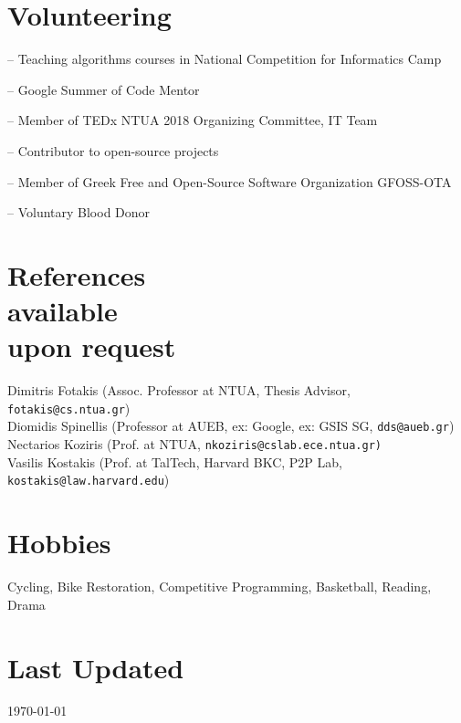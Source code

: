\documentclass[margin, 10pt]{res}
\begin{document}
\begin{resume}
\section{Volunteering} 
\begin{compactitem}
    \item[--] Teaching algorithms courses in National Competition for Informatics Camp 
    \item[--] Google Summer of Code Mentor
    \item[--] Member of TEDx NTUA 2018 Organizing Committee, IT Team 
    \item[--] Contributor to open-source projects
    \item[--] Member of Greek Free and Open-Source Software Organization GFOSS-OTA
    \item[--] Voluntary Blood Donor

\end{compactitem}

\section{References \\ available \\ upon request}

Dimitris Fotakis \hfill (Assoc. Professor at NTUA, Thesis Advisor, \texttt{fotakis@cs.ntua.gr}) \\
Diomidis Spinellis \hfill (Professor at AUEB, ex: Google, ex: GSIS SG, \texttt{dds@aueb.gr}) \\
Nectarios Koziris \hfill (Prof. at NTUA, \texttt{nkoziris@cslab.ece.ntua.gr)} \\
Vasilis Kostakis \hfill (Prof. at TalTech, Harvard BKC, P2P Lab, \texttt{kostakis@law.harvard.edu}) \\

\section{Hobbies}
Cycling, Bike Restoration, Competitive Programming, Basketball, Reading, Drama

\section{Last Updated} \today

\begin{comment}

\section{Selected \\ Projects \& Published \\ Software} 


\end{comment}
\end{resume}
\end{document}
